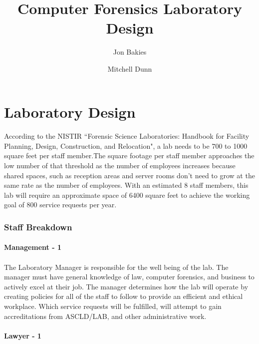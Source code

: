\documentclass{article}
\begin{document}
\title{Computer Forensics Laboratory Design}
\author{Jon Bakies \and Mitchell Dunn} 

\maketitle
\newpage

\tableofcontents
\newpage


\section{Laboratory Design}
\paragraph{} According to the NISTIR ``Forensic Science Laboratories: Handbook for Facility Planning, Design, Construction, and Relocation", a lab needs to be 700 to 1000 square feet per staff member.The square footage per staff member approaches the low number of that threshold as the number of employees increases because shared spaces, such as reception areas and server rooms don't need to grow at the same rate as the number of employees.  With an estimated 8 staff members, this lab will require an approximate space of 6400 square feet to achieve the working goal of 800 service requests per year.
\subsubsection{Staff Breakdown}
\paragraph {Management - 1} 
\paragraph{} The Laboratory Manager is responsible for the well being of the lab.  The manager must have general knowledge of law, computer forensics, and business to actively excel at their job.  The manager determines how the lab will operate by creating policies for all of the staff to follow to provide an efficient and ethical workplace.  Which service requests will be fulfilled, will attempt to gain accreditations from ASCLD/LAB, and other administrative work.  
 
\paragraph{Lawyer - 1} 
\end{document}
